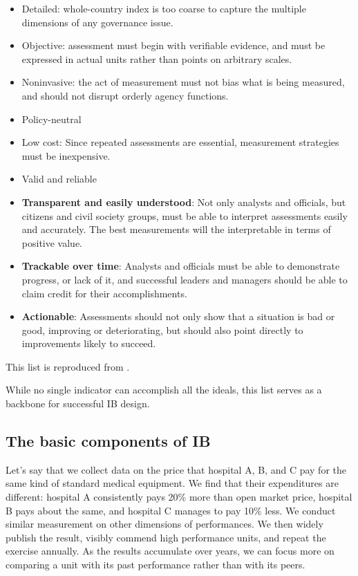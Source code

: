 \documentclass[12pt]{article}
\begin{document}
\begin{itemize}[noitemsep]
\item{Detailed: whole-country index is too coarse to capture the multiple dimensions of any governance issue.}
\item{Objective: assessment must begin with verifiable evidence, and must be expressed in actual units rather than points on arbitrary scales.}
\item{Noninvasive: the act of measurement must not bias what is being measured, and should not disrupt orderly agency functions.}
\item{Policy-neutral}
\item{Low cost: Since repeated assessments are essential, measurement strategies must be inexpensive.}
\item{Valid and reliable}
\item{\textbf{Transparent and easily understood}: Not only analysts and officials, but citizens and civil society groups, must be able to interpret assessments easily and accurately. The best measurements will the interpretable in terms of positive value.}
\item{\textbf{Trackable over time}: Analysts and officials must be able to demonstrate progress, or lack of it, and successful leaders and managers should be able to claim credit for their accomplishments.}
\item{\textbf{Actionable}: Assessments should not only show that a situation is bad or good, improving or deteriorating, but should also point directly to improvements likely to succeed.}
\end{itemize}

This list is reproduced from \citet{Johnston2010}.

While no single indicator can accomplish all the ideals, this list serves as a backbone for successful IB design.

\subsection{The basic components of IB} \label{sec:basicstrategy}

Let's say that we collect data on the price that hospital A, B, and C pay for the same kind of standard medical equipment. We find that their expenditures are different: hospital A consistently pays 20\% more than open market price, hospital B pays about the same, and hospital C manages to pay 10\% less. We conduct similar measurement on other dimensions of performances. We then widely publish the result, visibly commend high performance units, and repeat the exercise annually. As the results accumulate over years, we can focus more on comparing a unit with its past performance rather than with its peers.
\end{document}
